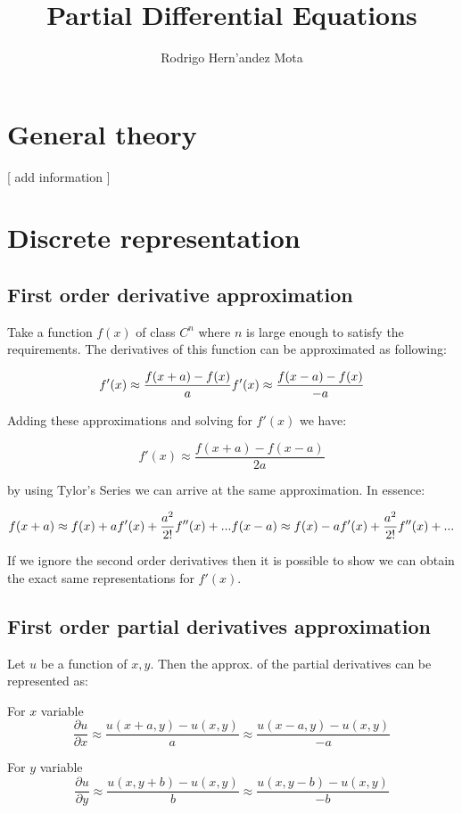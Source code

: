 \documentclass[11p]{report}
\begin{document}
\title{Partial Differential Equations}
\author{Rodrigo Hern'andez Mota}

\maketitle

\section{General theory}
[ add information ]

\section{Discrete representation}
\subsection{First order derivative approximation}
Take a function $f(x)$ of class $C^n$ where $n$ is large enough to satisfy the requirements. The derivatives of this function can be approximated as following:

\begin{equation}
f'(x) \approx \frac{f(x+a)-f(x)}{a} \\
f'(x) \approx \frac{f(x-a)-f(x)}{-a} 
\end{equation}

Adding these approximations and solving for $f'(x)$ we have:

\begin{equation}
f'(x) \approx \frac{f(x+a)-f(x-a)}{2a}
\end{equation}

by using Tylor's Series we can arrive at the same approximation. In essence:

\begin{equation}
f(x+a) \approx f(x) + a f'(x) + \frac{a^2}{2!} f''(x) + ... \\
f(x-a) \approx f(x) - a f'(x) + \frac{a^2}{2!} f''(x) + ...
\end{equation}

If we ignore the second order derivatives then it is possible to show we can obtain the exact same representations for $f'(x)$. 

\subsection{First order partial derivatives approximation}
Let $u$ be a function of $x,y$. Then the approx. of the partial derivatives can be represented as:

For $x$ variable
\begin{equation}
\frac{\partial u}{\partial x} \approx \frac{u(x+a,y)-u(x,y)}{a} \approx  \frac{u(x-a,y) - u(x,y)}{-a}
\end{equation}

For $y$ variable
\begin{equation}
\frac{\partial u}{\partial y} \approx \frac{u(x,y+b)-u(x,y)}{b} \approx \frac{u(x,y-b)-u(x,y)}{-b}
\end{equation} 
\end{document}
